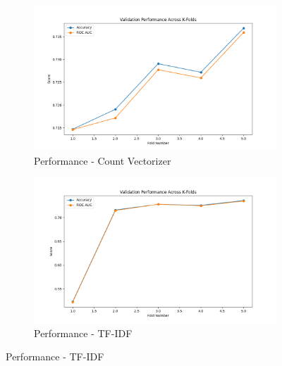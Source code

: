 \begin{figure}[H]
    \centering
    \begin{subfigure}[b]{0.48\textwidth}
        \includegraphics[width=\textwidth]{img/report_info/img/2.2.MLP/best_mlp_count.png}
        \caption{Performance - Count Vectorizer}
        \label{fig:mlp-count}
    \end{subfigure}
    \begin{subfigure}[b]{0.48\textwidth}
        \includegraphics[width=\textwidth]{img/report_info/img/2.2.MLP/best_mlp_tfidf.png}
        \caption{Performance - TF-IDF}
        \label{fig:mlp-tfidf}
    \end{subfigure}
    

\end{figure}
